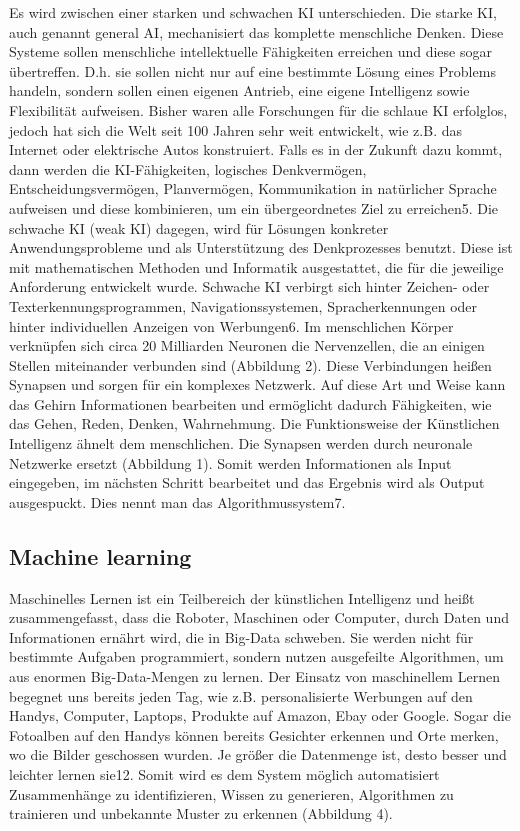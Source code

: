 Es wird zwischen einer starken und schwachen KI unterschieden. Die starke KI, auch genannt general AI, mechanisiert das komplette menschliche Denken. 
Diese Systeme sollen menschliche intellektuelle Fähigkeiten erreichen und diese sogar übertreffen. D.h. sie sollen nicht nur auf eine bestimmte Lösung eines 
Problems handeln, sondern sollen einen eigenen Antrieb, eine eigene Intelligenz sowie Flexibilität aufweisen. Bisher waren alle Forschungen für die schlaue KI 
erfolglos, jedoch hat sich die Welt seit 100 Jahren sehr weit entwickelt, wie z.B. das Internet oder elektrische Autos konstruiert. 
Falls es in der Zukunft dazu kommt, dann werden die KI-Fähigkeiten, logisches Denkvermögen, Entscheidungsvermögen, Planvermögen, Kommunikation in natürlicher Sprache 
aufweisen und diese kombinieren, um ein übergeordnetes Ziel zu erreichen5. Die schwache KI (weak KI) dagegen, wird für Lösungen konkreter Anwendungsprobleme und 
als Unterstützung des Denkprozesses benutzt. Diese ist mit mathematischen Methoden und Informatik ausgestattet, die für die jeweilige Anforderung entwickelt wurde.
Schwache KI verbirgt sich hinter Zeichen- oder Texterkennungsprogrammen, Navigationssystemen, Spracherkennungen oder hinter individuellen Anzeigen von Werbungen6.
Im menschlichen Körper verknüpfen sich circa 20 Milliarden Neuronen die Nervenzellen, die an einigen Stellen miteinander verbunden sind (Abbildung 2). 
Diese Verbindungen heißen Synapsen und sorgen für ein komplexes Netzwerk. Auf diese Art und Weise kann das Gehirn Informationen bearbeiten und ermöglicht dadurch
Fähigkeiten, wie das Gehen, Reden, Denken, Wahrnehmung. Die Funktionsweise der Künstlichen Intelligenz ähnelt dem menschlichen. Die Synapsen werden durch neuronale
Netzwerke ersetzt (Abbildung 1). Somit werden Informationen als Input eingegeben, im nächsten Schritt bearbeitet und das Ergebnis wird als Output
ausgespuckt. Dies nennt man das Algorithmussystem7.

\subsection{Machine learning}

Maschinelles Lernen ist ein Teilbereich der künstlichen Intelligenz und heißt zusammengefasst, dass die Roboter, Maschinen oder Computer, durch 
Daten und Informationen ernährt wird, die in Big-Data schweben. Sie werden nicht für bestimmte Aufgaben programmiert, sondern nutzen ausgefeilte Algorithmen, 
um aus enormen Big-Data-Mengen zu lernen. Der Einsatz von maschinellem Lernen begegnet uns bereits jeden Tag, wie z.B. personalisierte Werbungen auf den Handys,
Computer, Laptops, Produkte auf Amazon, Ebay oder Google. Sogar die Fotoalben auf den Handys können bereits Gesichter erkennen und Orte merken, 
wo die Bilder geschossen wurden. Je größer die Datenmenge ist, desto besser und leichter lernen sie12. Somit wird es dem System möglich automatisiert 
Zusammenhänge zu identifizieren, Wissen zu generieren, Algorithmen zu trainieren und unbekannte Muster zu erkennen (Abbildung 4).
\newline

